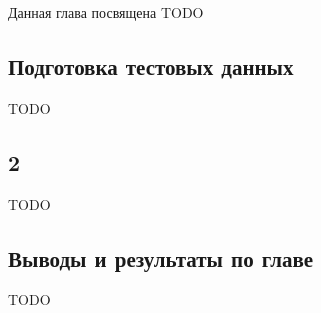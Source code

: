 \documentclass[../diploma.tex]{subfiles}
\begin{document}
\label{sec:3}

Данная глава посвящена TODO

\subsection{Подготовка тестовых данных}

TODO

\subsection{2}

TODO

\subsection{Выводы и результаты по главе}

TODO
\end{document}
